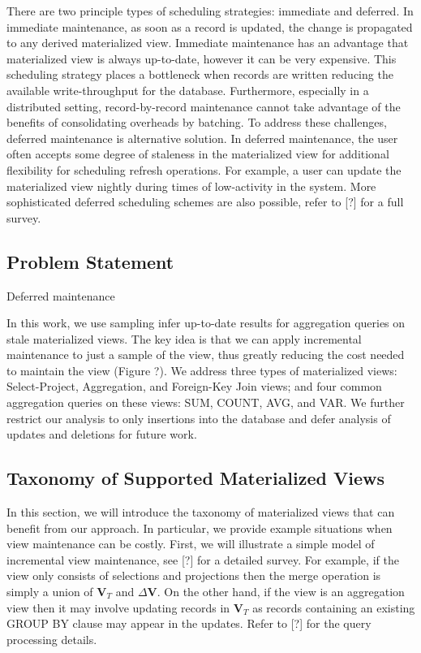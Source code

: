 There are two principle types of scheduling strategies: immediate and deferred. 
In immediate maintenance, as soon as a record is updated, 
the change is propagated to any derived materialized view.
Immediate maintenance has an advantage that materialized view is always up-to-date, 
however it can be very expensive.
This scheduling strategy places a bottleneck when records are written reducing 
the available write-throughput for the database.
Furthermore, especially in a distributed setting, record-by-record 
maintenance cannot take advantage of the benefits of consolidating overheads by batching.
To address these challenges, deferred maintenance is alternative solution.
In deferred maintenance, the user often accepts some degree of staleness in 
the materialized view for additional flexibility for scheduling refresh operations.
For example, a user can update the materialized view 
nightly during times of low-activity in the system.
More sophisticated deferred scheduling schemes are also possible, refer to [?] for a full survey.

\subsection{Problem Statement}
Deferred maintenance 

In this work, we use sampling infer up-to-date results for aggregation
queries on stale materialized views. The key idea is that we can apply
incremental maintenance to just a sample of the view, thus greatly
reducing the cost needed to maintain the view (Figure ?). We address
three types of materialized views: Select-Project, Aggregation, and
Foreign-Key Join views; and four common aggregation queries on these
views: SUM, COUNT, AVG, and VAR. We further restrict our analysis
to only insertions into the database and defer analysis of updates
and deletions for future work.


\subsection{Taxonomy of Supported Materialized Views}

In this section, we will introduce the taxonomy of materialized views
that can benefit from our approach. In particular, we provide example
situations when view maintenance can be costly. First, we will illustrate
a simple model of incremental view maintenance, see {[}?{]} for a
detailed survey.  For example, if
the view only consists of selections and projections then the merge
operation is simply a union of $\textbf{V}_{T}$ and $\Delta\textbf{V}$.
On the other hand, if the view is an aggregation view then it may
involve updating records in $\textbf{V}_{T}$ as records containing
an existing GROUP BY clause may appear in the updates. Refer to {[}?{]}
for the query processing details.


